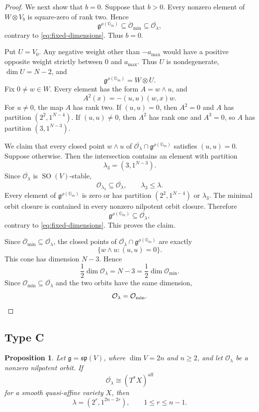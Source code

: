 \documentclass[12pt]{article}
\newtheorem{proposition}[theorem]{Proposition}
\theoremstyle{remark}
\theoremstyle{plain}
\newcommand{\Gm}{\mathbb G_m}
\newcommand{\aff}{\mathrm{aff}}
\begin{document}
\begin{proof}
We next show that $b=0$. Suppose that $b>0$. Every nonzero element of
$W\otimes V_b$ is square-zero of rank two. Hence
\[
\mathfrak g^{\rho(\Gm)}
\subseteq\overline{\mathcal O}_{\min}
\subseteq\overline{\mathcal O_\lambda},
\]
contrary to \eqref{eq:fixed-dimensions}. Thus $b=0$.

Put $U=V_0$. Any negative weight other than $-a_{\max}$ would
have a positive opposite weight strictly between $0$ and $a_{\max}$.
Thus $U$ is nondegenerate, $\dim U=N-2$, and
\[
\mathfrak g^{\rho(\Gm)}=W\otimes U.
\]
Fix $0\ne w\in W$. Every element has the form $A=w\wedge u$, and
\[
A^2(x)=-(u,u)(w,x)w.
\]
For $u\ne0$, the map $A$ has rank two. If $(u,u)=0$, then $A^2=0$
and $A$ has partition $(2^2,1^{N-4})$. If $(u,u)\ne0$, then $A^2$
has rank one and $A^3=0$, so $A$ has partition $(3,1^{N-3})$.

We claim that every closed point $w\wedge u$ of
$\overline{\mathcal O_\lambda}\cap\mathfrak g^{\rho(\Gm)}$
satisfies $(u,u)=0$. Suppose otherwise. Then the intersection contains
an element with partition
\[
\lambda_3=(3,1^{N-3}).
\]
Since $\overline{\mathcal O_\lambda}$ is $\operatorname{SO}(V)$-stable,
\[
\mathcal O_{\lambda_3}\subseteq\overline{\mathcal O_\lambda},
\qquad
\lambda_3\leq\lambda.
\]
Every element of $\mathfrak g^{\rho(\Gm)}$ is zero or has partition
$(2^2,1^{N-4})$ or $\lambda_3$. The minimal orbit closure is contained
in every nonzero nilpotent orbit closure. Therefore
\[
\mathfrak g^{\rho(\Gm)}\subseteq\overline{\mathcal O_\lambda},
\]
contrary to \eqref{eq:fixed-dimensions}. This proves the claim.

Since
$\overline{\mathcal O}_{\min}\subseteq\overline{\mathcal O_\lambda}$,
the closed points of
$\overline{\mathcal O_\lambda}\cap\mathfrak g^{\rho(\Gm)}$ are
exactly
\[
\{w\wedge u:(u,u)=0\}.
\]
This cone has dimension $N-3$. Hence
\[
\frac12\dim\mathcal O_\lambda=N-3
=\frac12\dim\mathcal O_{\min}.
\]
Since $\mathcal O_{\min}\subseteq\overline{\mathcal O_\lambda}$ and
the two orbits have the same dimension,
\[
\mathcal O_\lambda=\mathcal O_{\min}.
\qedhere
\]
\end{proof}

\subsection{Type C}\label{sec:typeC}

\begin{proposition}\label{prop:typeC}
Let $\mathfrak g=\mathfrak{sp}(V)$, where $\dim V=2n$ and $n\geq2$,
and let $\mathcal O_\lambda$ be a nonzero nilpotent orbit. If
\[
\overline{\mathcal O_\lambda}\cong(T^*X)^{\aff}
\]
for a smooth quasi-affine variety $X$, then
\[
\lambda=(2^r,1^{2n-2r}),
\qquad
1\leq r\leq n-1.
\]
\end{proposition}
\end{document}
